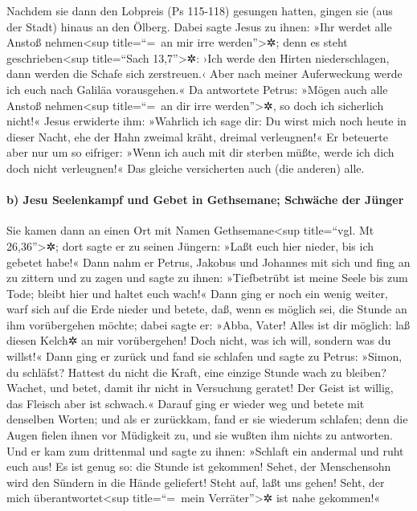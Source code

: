  Nachdem sie dann den Lobpreis (Ps 115-118) gesungen
hatten, gingen sie (aus der Stadt) hinaus an den Ölberg. 
Dabei sagte Jesus zu ihnen: »Ihr werdet alle Anstoß nehmen\textless sup
title=``=~an mir irre werden''\textgreater✲; denn es steht
geschrieben\textless sup title=``Sach 13,7''\textgreater✲: ›Ich werde
den Hirten niederschlagen, dann werden die Schafe sich zerstreuen.‹
 Aber nach meiner Auferweckung werde ich euch nach
Galiläa vorausgehen.«  Da antwortete Petrus: »Mögen auch
alle Anstoß nehmen\textless sup title=``=~an dir irre
werden''\textgreater✲, so doch ich sicherlich nicht!« 
Jesus erwiderte ihm: »Wahrlich ich sage dir: Du wirst mich noch heute in
dieser Nacht, ehe der Hahn zweimal kräht, dreimal verleugnen!«
 Er beteuerte aber nur um so eifriger: »Wenn ich auch mit
dir sterben müßte, werde ich dich doch nicht verleugnen!« Das gleiche
versicherten auch (die anderen) alle.

\hypertarget{b-jesu-seelenkampf-und-gebet-in-gethsemane-schwuxe4che-der-juxfcnger}{%
\paragraph{b) Jesu Seelenkampf und Gebet in Gethsemane; Schwäche der
Jünger}\label{b-jesu-seelenkampf-und-gebet-in-gethsemane-schwuxe4che-der-juxfcnger}}

 Sie kamen dann an einen Ort mit Namen
Gethsemane\textless sup title=``vgl. Mt 26,36''\textgreater✲; dort sagte
er zu seinen Jüngern: »Laßt euch hier nieder, bis ich gebetet habe!«
 Dann nahm er Petrus, Jakobus und Johannes mit sich und
fing an zu zittern und zu zagen  und sagte zu ihnen:
»Tiefbetrübt ist meine Seele bis zum Tode; bleibt hier und haltet euch
wach!«  Dann ging er noch ein wenig weiter, warf sich auf
die Erde nieder und betete, daß, wenn es möglich sei, die Stunde an ihm
vorübergehen möchte;  dabei sagte er: »Abba, Vater! Alles
ist dir möglich: laß diesen Kelch✲ an mir vorübergehen! Doch nicht, was
ich will, sondern was du willst!«  Dann ging er zurück
und fand sie schlafen und sagte zu Petrus: »Simon, du schläfst? Hattest
du nicht die Kraft, eine einzige Stunde wach zu bleiben? 
Wachet, und betet, damit ihr nicht in Versuchung geratet! Der Geist ist
willig, das Fleisch aber ist schwach.«  Darauf ging er
wieder weg und betete mit denselben Worten;  und als er
zurückkam, fand er sie wiederum schlafen; denn die Augen fielen ihnen
vor Müdigkeit zu, und sie wußten ihm nichts zu antworten.
 Und er kam zum drittenmal und sagte zu ihnen: »Schlaft
ein andermal und ruht euch aus! Es ist genug so: die Stunde ist
gekommen! Sehet, der Menschensohn wird den Sündern in die Hände
geliefert!  Steht auf, laßt uns gehen! Seht, der mich
überantwortet\textless sup title=``=~mein Verräter''\textgreater✲ ist
nahe gekommen!«

